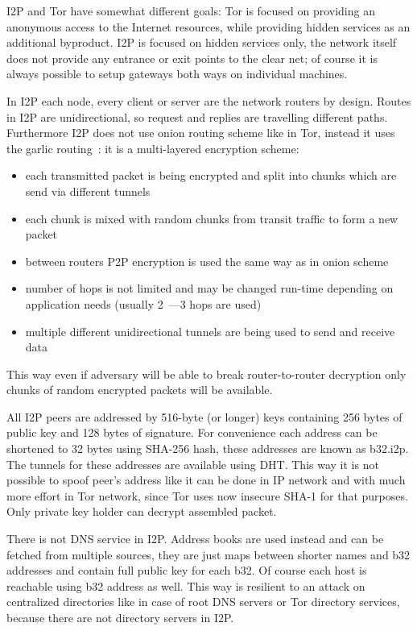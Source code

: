 \documentclass[10pt, a5paper]{article}
\begin{document}
I2P and Tor have somewhat different goals: Tor is focused on \linebreak providing an anonymous access to the Internet resources, while providing hidden services as an additional byproduct. I2P is focused on hidden services only, the network itself does not provide any entrance or exit points to the clear net; of course it is always possible to setup gateways both ways on individual machines.

In I2P each node, every client or server are the network routers by design. Routes in I2P are unidirectional, so request and replies are travelling different paths. Furthermore I2P does not use onion routing scheme like in Tor, instead it uses the garlic routing~\cite{Savchenko-3}: it is a multi-layered encryption scheme:

\begin{itemize}
  \item each transmitted packet is being encrypted and split into chunks which are send via different tunnels
  \item each chunk is mixed with random chunks from transit traffic to form a new packet
  \item between routers P2P encryption is used the same way as in onion scheme
  \item number of hops is not limited and may be changed run-time depending on application needs (usually 2~---3 hops are used)
  \item multiple different unidirectional tunnels are being used to send and receive data
\end{itemize}

This way even if adversary will be able to break router-to-router decryption only chunks of random encrypted packets will be available.

All I2P peers are addressed by 516-byte (or longer) keys containing 256 bytes of public key and 128 bytes of signature. For convenience each address can be shortened to 32 bytes using SHA-256 hash, these addresses are known as b32.i2p. The tunnels for these addresses are available using DHT. This way it is not possible to spoof peer's address like it can be done in IP network and with much more effort in Tor network, since Tor uses now insecure SHA-1 for that purposes. Only private key holder can decrypt assembled packet.

There is not DNS service in I2P. Address books are used instead and can be fetched from multiple sources, they are just maps between shorter names and b32 addresses and contain full public key for each b32. Of course each host is reachable using b32 address as well. This way is resilient to an attack on centralized directories like in case of root DNS servers or Tor directory services, because there are not directory servers in I2P.
\end{document}
